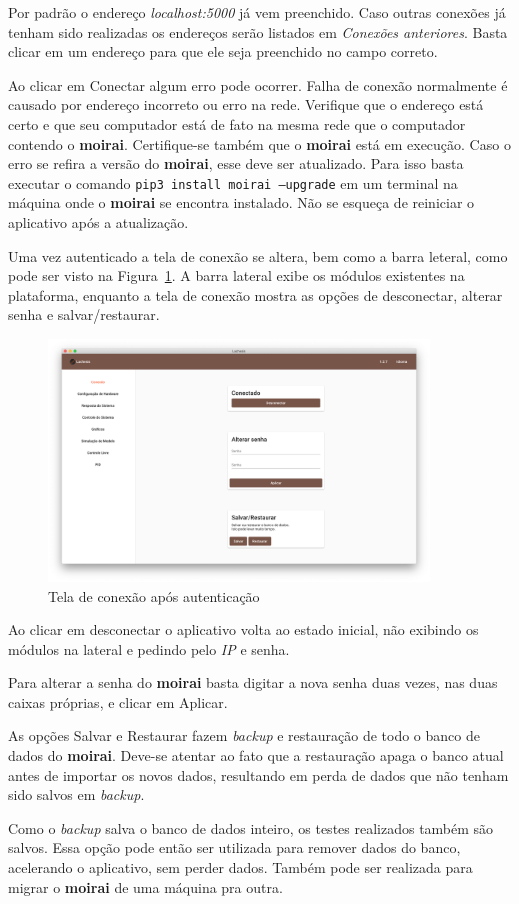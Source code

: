 Por padrão o endereço \textit{localhost:5000} já vem preenchido. Caso outras
conexões já tenham sido realizadas os endereços serão listados em
\textit{Conexões anteriores}. Basta clicar em um endereço para que ele seja
preenchido no campo correto.

Ao clicar em Conectar algum erro pode ocorrer. Falha de conexão normalmente é
causado por endereço incorreto ou erro na rede. Verifique que o endereço está
certo e que seu computador está de fato na mesma rede que o computador contendo
o \textbf{moirai}. Certifique-se também que o \textbf{moirai} está em execução.
Caso o erro se refira a versão do \textbf{moirai}, esse deve ser atualizado.
Para isso basta executar o comando \texttt{pip3 install moirai
--upgrade} em um terminal na máquina onde o \textbf{moirai} se encontra
instalado. Não se esqueça de reiniciar o aplicativo após a atualização.

Uma vez autenticado a tela de conexão se altera, bem como a barra leteral, como
pode ser visto na Figura~\ref{fig:connection-screen}. A barra lateral exibe os
módulos existentes na plataforma, enquanto a tela de conexão mostra as opções de
desconectar, alterar senha e salvar/restaurar.

\begin{figure}[ht!]
    \centering
    \includegraphics[width=0.9\textwidth]{imgs/connection-screen}
    \caption[Tela de conexão após autenticação]{Tela de conexão após autenticação}%
    \label{fig:connection-screen}
\end{figure}

Ao clicar em desconectar o aplicativo volta ao estado inicial, não exibindo os
módulos na lateral e pedindo pelo \textit{IP} e senha.

Para alterar a senha do \textbf{moirai} basta digitar a nova senha duas vezes,
nas duas caixas próprias, e clicar em Aplicar.

As opções Salvar e Restaurar fazem \textit{backup} e restauração de todo o banco
de dados do \textbf{moirai}. Deve-se atentar ao fato que a restauração apaga o
banco atual antes de importar os novos dados, resultando em perda de dados que
não tenham sido salvos em \textit{backup}.

Como o \textit{backup} salva o banco de dados inteiro, os testes realizados
também são salvos. Essa opção pode então ser utilizada para remover dados do
banco, acelerando o aplicativo, sem perder dados. Também pode ser realizada para
migrar o \textbf{moirai} de uma máquina pra outra.
